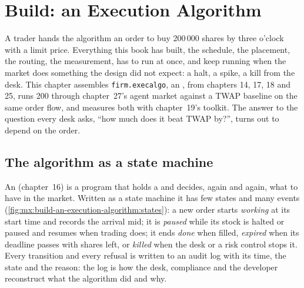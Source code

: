 \chapter{Build: an Execution Algorithm}\label{ch:mx:build-an-execution-algorithm}

A trader hands the algorithm an order to buy 200\,000 shares by three o'clock with a limit price. Everything this book has built, the schedule, the
placement, the routing, the measurement, has to run at once, and keep running when the market does something the design did not expect: a halt, a
spike, a kill from the desk. This chapter assembles \texttt{firm.execalgo}, an , from chapters 14, 17, 18 and 25, runs
200  through chapter~27's agent market against a TWAP baseline on the same order flow, and measures both with chapter~19's toolkit. The
answer to the question every desk asks, ``how much does it beat TWAP by?'', turns out to depend on the order.

\section{The algorithm as a state machine}

An  (chapter~16) is a program that holds a  and decides, again and again, what  to have in the market.
Written as a state machine it has few states and many events (\cref{fig:mx:build-an-execution-algorithm:states}): a new order starts \emph{working} at
its start time and records the arrival mid; it is \emph{paused} while its stock is halted or paused and resumes when trading does; it ends \emph{done}
when filled, \emph{expired} when its deadline passes with shares left, or \emph{killed} when the desk or a risk control stops it. Every transition and
every refusal is written to an audit log with its time, the state and the reason: the log is how the desk, compliance and the developer reconstruct what
the algorithm did and why.

